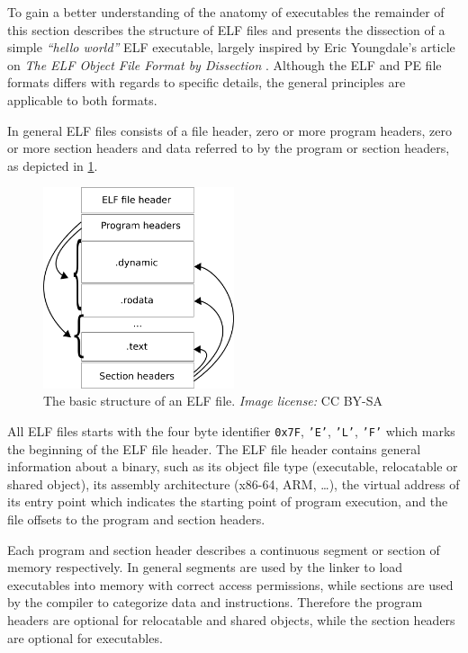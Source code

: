 To gain a better understanding of the anatomy of executables the remainder of this section describes the structure of ELF files and presents the dissection of a simple \textit{``hello world''} ELF executable, largely inspired by Eric Youngdale's article on \textit{The ELF Object File Format by Dissection} \cite{elf_dissection}. Although the ELF and PE file formats differs with regards to specific details, the general principles are applicable to both formats.

In general ELF files consists of a file header, zero or more program headers, zero or more section headers and data referred to by the program or section headers, as depicted in \cref{fig:elf_file_structure}.

\begin{figure}[htbp]
	\begin{center}
		\includegraphics[width=0.5\textwidth]{inc/elf_file_structure.png}
		\caption{The basic structure of an ELF file. \textit{Image license:} CC BY-SA \cite{elf_structure_orig}}
		\label{fig:elf_file_structure}
	\end{center}
\end{figure}

All ELF files starts with the four byte identifier \texttt{0x7F}, \texttt{'E'}, \texttt{'L'}, \texttt{'F'} which marks the beginning of the ELF file header. The ELF file header contains general information about a binary, such as its object file type (executable, relocatable or shared object), its assembly architecture (x86-64, ARM, …), the virtual address of its entry point which indicates the starting point of program execution, and the file offsets to the program and section headers.

Each program and section header describes a continuous segment or section of memory respectively. In general segments are used by the linker to load executables into memory with correct access permissions, while sections are used by the compiler to categorize data and instructions. Therefore the program headers are optional for relocatable and shared objects, while the section headers are optional for executables.


